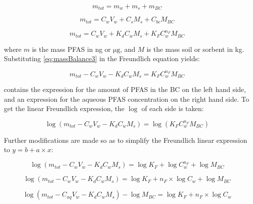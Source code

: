\begin{equation} \label{eq:massBalance1}
    m_{tot} = m_{w} + m_{s} + m_{BC}
\end{equation}

\begin{equation} \label{eq:massBalance2}
     m_{tot} = C_{w}V_{w} + C_sM_s + C_{bc}M_{BC}
\end{equation}

\begin{equation} \label{eq:massBalance3}
     m_{tot} = C_{w}V_{w} + K_dC_{w}M_s + K_{F}C_{w}^{n_F}M_{BC}
\end{equation}
 
where $m$ is the mass PFAS in ng or $\mathrm{\mu g}$, and $M$ is the mass soil or sorbent in kg. Substituting \cref{eq:massBalance3} in the Freundlich equation yields:

\begin{equation} \label{eq:FreundFit}
    m_{tot} - C_{w}V_{w} - K_dC_{w}M_s = K_{F}C_{w}^{n_F}M_{BC}
\end{equation}

 contains the expression for the amount of PFAS in the BC on the left hand side, and an expression for the aqueous PFAS concentration on the right hand side. To get the linear Freundlich expression, the $\log$ of each side is taken:

\begin{equation} \label{eq:FreundLinSoil1}
   \log (m_{tot} - C_{w}V_{w} - K_dC_{w}M_s) = \log (K_{F}C_{w}^{n_F}M_{BC})
\end{equation}

Further modifications are made so as to simplify the Freundlich linear expression to $y = b + a \times x$:

\begin{equation} \label{eq:FreundLinSoil2}
    \log (m_{tot} - C_{w}V_{w} - K_dC_{w}M_s) = \log K_{F} + \log C_{w}^{n_F} + \log M_{BC}
\end{equation}

\begin{equation} \label{eq:FreundLinSoil3}
    \log (m_{tot} - C_{w}V_{w} - K_dC_{w}M_s) = \log K_{F} + n_F \times \log C_{w} + \log M_{BC}
\end{equation}

\begin{equation} \label{eq:FreundLinSoil4}
    \log (m_{tot} - C_{aq}V_{w} - K_dC_{w}M_s) - \log M_{BC} = \log K_{F} + n_F \times \log C_{w}  
\end{equation}

